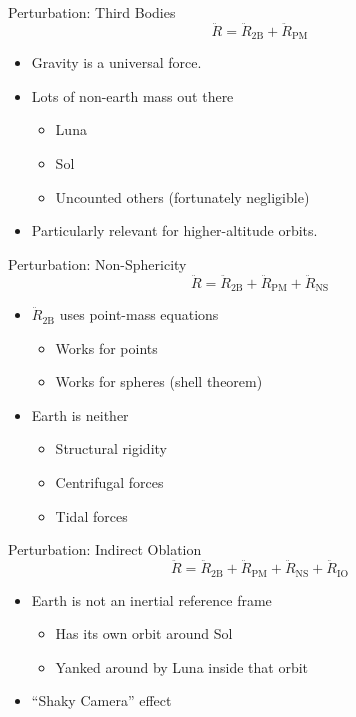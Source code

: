 \documentclass[pdf]{beamer}
\begin{document}
\begin{frame}{Perturbation: Third Bodies}
  \[ \ddot{R} = \ddot{R}_\text{2B} + \ddot{R}_\text{PM}\]

  \begin{itemize}
  \item Gravity is a universal force.
  \item Lots of non-earth mass out there
    \begin{itemize}
    \item Luna
    \item Sol
    \item Uncounted others (fortunately negligible)
    \end{itemize}
  \item Particularly relevant for higher-altitude orbits.
  \end{itemize}
\end{frame}

\begin{frame}{Perturbation: Non-Sphericity}
  \[ \ddot{R} = \ddot{R}_\text{2B} + \ddot{R}_\text{PM} + \ddot{R}_\text{NS} \]
  \begin{itemize}
  \item $\ddot{R}_\text{2B}$ uses point-mass equations
    \begin{itemize}
    \item Works for points
    \item Works for spheres (shell theorem)
    \end{itemize}
  \item Earth is neither
    \begin{itemize}
    \item Structural rigidity
    \item Centrifugal forces
    \item Tidal forces
    \end{itemize}
  \end{itemize}
\end{frame}

\begin{frame}{Perturbation: Indirect Oblation}
  \[ \ddot{R} = \ddot{R}_\text{2B} + \ddot{R}_\text{PM} + \ddot{R}_\text{NS}  + \ddot{R}_\text{IO}\]
  \begin{itemize}
  \item Earth is not an inertial reference frame
    \begin{itemize}
    \item Has its own orbit around Sol
    \item Yanked around by Luna inside that orbit
    \end{itemize}
  \item ``Shaky Camera'' effect
  \end{itemize}
\end{frame}
\end{document}
